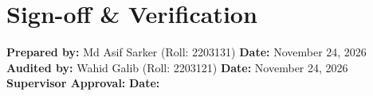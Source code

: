 \documentclass[11pt,a4paper]{article}
\begin{document}
\section{Sign-off \& Verification}
\vspace{0.8cm}
\noindent\textbf{Prepared by:} Md Asif Sarker (Roll: 2203131) \hfill \textbf{Date:} November 24, 2026 \\[0.8cm]
\noindent\textbf{Audited by:} Wahid Galib (Roll: 2203121) \hfill \textbf{Date:} November 24, 2026 \\[0.8cm]
\noindent\textbf{Supervisor Approval:} \underline{\hspace{7cm}} \hfill \textbf{Date:} \underline{\hspace{3cm}}
\end{document}
